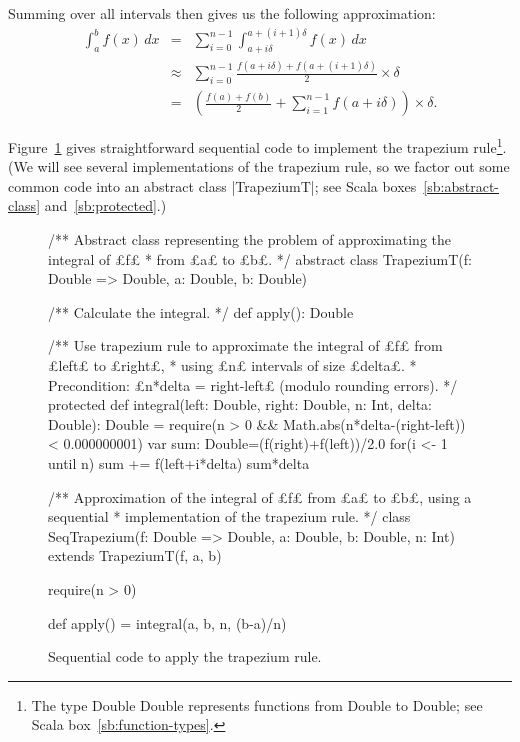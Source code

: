 Summing over all intervals then gives us the following approximation:
\begin{eqnarray*}
\int_a^b f(x) \, dx  & = & 
  \sum_{i = 0}^{n-1} \int_{a+i\delta}^{a+(i+1)\delta} f(x)\, dx \\
& \approx & 
  \sum_{i=0}^{n-1} \frac{f(a+i\delta) + f(a+(i+1)\delta)}{2} \times \delta \\
& = &
  \left( \frac{f(a)+f(b)}{2} + \sum_{i=1}^{n-1} f(a+i\delta) \right) \times \delta.
\end{eqnarray*}

Figure~\ref{fig:trapezium-sequential} gives straightforward sequential code to
implement the trapezium rule\footnote{The type {\scalashape
Double \protect\SCALA{=>} Double} represents functions from {\scalashape
Double} to {\scalashape Double}; see Scala box~\ref{sb:function-types}.}.  (We
will see several implementations of the trapezium rule, so we factor out some
common code into an abstract class |TrapeziumT|; see Scala
boxes~\ref{sb:abstract-class} and~\ref{sb:protected}.)


\begin{figure}
\begin{scala}
/** Abstract class representing the problem of approximating the integral of £f£
  * from £a£ to £b£. */
abstract class TrapeziumT(f: Double => Double, a: Double, b: Double){
  /** Calculate the integral. */
  def apply(): Double

  /** Use trapezium rule to approximate the integral of £f£ from £left£ to £right£, 
    * using £n£ intervals of size £delta£. 
    * Precondition: £n*delta = right-left£ (modulo rounding errors). */
  protected 
  def integral(left: Double, right: Double, n: Int, delta: Double): Double = {
    require(n > 0 && Math.abs(n*delta-(right-left)) < 0.000000001) 
    var sum: Double=(f(right)+f(left))/2.0
    for(i <- 1 until n) sum += f(left+i*delta)
    sum*delta
  }
}

/** Approximation of the integral of £f£ from £a£ to £b£, using a sequential 
  * implementation of the trapezium rule. */
class SeqTrapezium(f: Double => Double, a: Double, b: Double, n: Int)
    extends TrapeziumT(f, a, b){
  require(n > 0)

  def apply() = integral(a, b, n, (b-a)/n)
}
\end{scala}
\caption{Sequential code to apply the trapezium rule.}
\label{fig:trapezium-sequential}
\end{figure}

